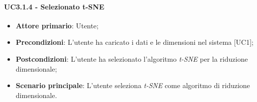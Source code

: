 \paragraph{UC3.1.4 - Selezionato t-SNE}

\begin{itemize}
	\item \textbf{Attore primario}: Utente;
	\item \textbf{Precondizioni}: L'utente ha caricato i dati e le dimensioni nel sistema [UC1];
	\item \textbf{Postcondizioni}: L'utente ha selezionato l'algoritmo \textit{t-SNE} per la riduzione dimensionale;
	\item \textbf{Scenario principale}: L'utente seleziona \textit{t-SNE} come algoritmo di riduzione dimensionale.
\end{itemize}